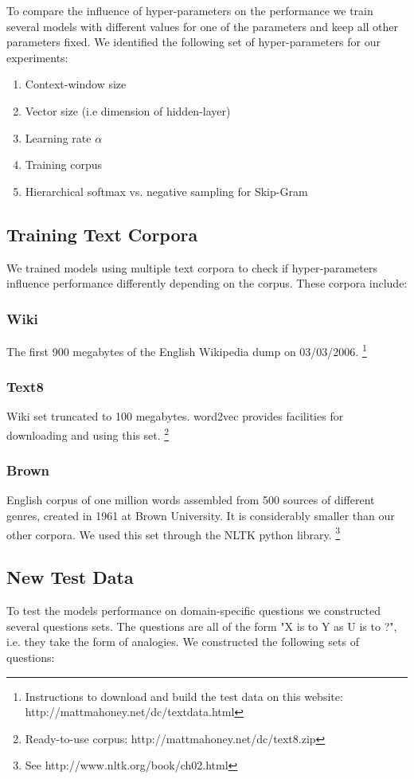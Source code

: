 \documentclass[conference]{IEEEtran}
\begin{document}
To compare the influence of hyper-parameters on the performance we train several models
with different values for one of the parameters and keep all other parameters fixed. We 
identified the following set of hyper-parameters for our experiments:
\begin{enumerate}
\item Context-window size
\item Vector size (i.e dimension of hidden-layer)
\item Learning rate $\alpha$
\item Training corpus
\item Hierarchical softmax vs. negative sampling for Skip-Gram
\end{enumerate}

\subsection{Training Text Corpora}

We trained models using multiple text corpora to check if hyper-parameters influence performance differently depending on the corpus.
These corpora include:
\subsubsection{Wiki}
The first 900 megabytes of the English Wikipedia dump on 03/03/2006.
\footnote{Instructions to download and build the test data on this website: http://mattmahoney.net/dc/textdata.html}

\subsubsection{Text8}
Wiki set truncated to 100 megabytes. word2vec provides facilities for downloading and using this set.
\footnote{Ready-to-use corpus: http://mattmahoney.net/dc/text8.zip}

\subsubsection{Brown}
English corpus of one million words assembled from 500 sources of different genres, created in 1961 at Brown University.
It is considerably smaller than our other corpora.
We used this set through the NLTK python library.
\footnote{See http://www.nltk.org/book/ch02.html}

\subsection{New Test Data}
To test the models performance on domain-specific questions we constructed several 
questions sets. The questions are all of the form "X is to Y as U is to ?", i.e. they take the 
form of analogies. We constructed the following sets of questions:
\end{document}
